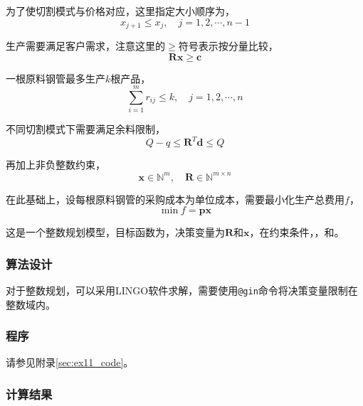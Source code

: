 为了使切割模式与价格对应，这里指定大小顺序为，
\begin{equation}\label{eq:ex11_cons_order}
    x_{j+1} \le x_j, \quad j=1,2,\cdots,n-1
\end{equation}

生产需要满足客户需求，注意这里的$\ge$符号表示按分量比较，
\begin{equation}\label{eq:ex11_cons_demand}
    \mathbf{Rx} \ge \mathbf{c}
\end{equation}

一根原料钢管最多生产$k$根产品，
\begin{equation}
    \sum_{i=1}^m r_{ij} \le k, \quad j=1,2,\cdots,n
\end{equation}

不同切割模式下需要满足余料限制，
\begin{equation}\label{eq:ex11_cons_remain}
    Q - q \le \mathbf{R}^T \mathbf{d} \le Q
\end{equation}

再加上非负整数约束，
\begin{equation}\label{eq:ex11_cons_int}
    \mathbf{x} \in \mathbb{N}^{m}, \quad \mathbf{R} \in \mathbb{N}^{m \times n}
\end{equation}

在此基础上，设每根原料钢管的采购成本为单位成本，需要最小化生产总费用$f$，
\begin{equation}\label{eq:ex11_objective}
    \min f = \mathbf{px}
\end{equation}

这是一个整数规划模型，目标函数为，决策变量为$\mathbf{R}$和$\mathbf{x}$，在约束条件，，和。

\subsubsection{算法设计}

对于整数规划，可以采用LINGO软件求解，需要使用\texttt{@gin}命令将决策变量限制在整数域内。

\subsubsection{程序}

请参见附录\ref{sec:ex11_code}。

\subsubsection{计算结果}

